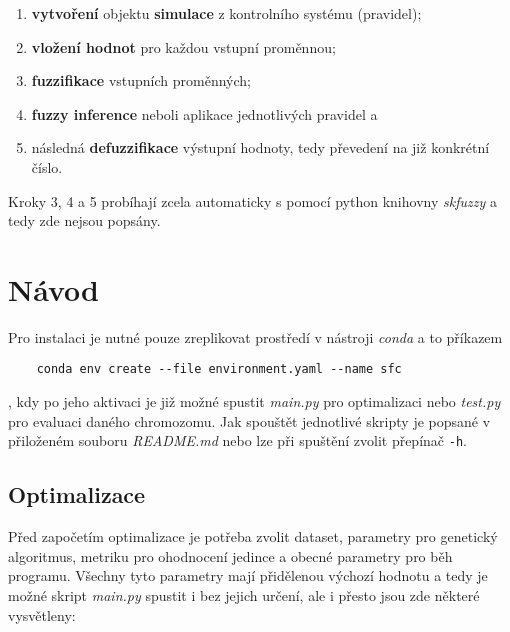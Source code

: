 \documentclass{article}
\begin{document}
\begin{enumerate}
    \samepage
    \item \textbf{vytvoření} objektu \textbf{simulace} z kontrolního systému (pravidel);
    \item \textbf{vložení hodnot} pro každou vstupní proměnnou;
    \item \textbf{fuzzifikace} vstupních proměnných;
    \item \textbf{fuzzy inference} neboli aplikace jednotlivých pravidel a
    \item následná \textbf{defuzzifikace} výstupní hodnoty, tedy převedení na již konkrétní číslo.
\end{enumerate}
Kroky 3, 4 a 5 probíhají zcela automaticky s pomocí python knihovny \emph{skfuzzy} a tedy zde nejsou popsány.

\section{Návod}

Pro instalaci je nutné pouze zreplikovat prostředí v nástroji \emph{conda} a to příkazem

\begin{verbatim}
    conda env create --file environment.yaml --name sfc
\end{verbatim}
, kdy po jeho aktivaci je již možné spustit \emph{main.py} pro optimalizaci nebo \emph{test.py} pro evaluaci daného chromozomu. Jak spouštět jednotlivé skripty je popsané v přiloženém souboru \emph{README.md} nebo lze při spuštění zvolit přepínač \texttt{-h}.

\subsection{Optimalizace}

Před započetím optimalizace je potřeba zvolit dataset, parametry pro genetický algoritmus, metriku pro ohodnocení jedince a obecné parametry pro běh programu. Všechny tyto parametry mají přidělenou výchozí hodnotu a tedy je možné skript \emph{main.py} spustit i bez jejich určení, ale i přesto jsou zde některé vysvětleny:
\end{document}
